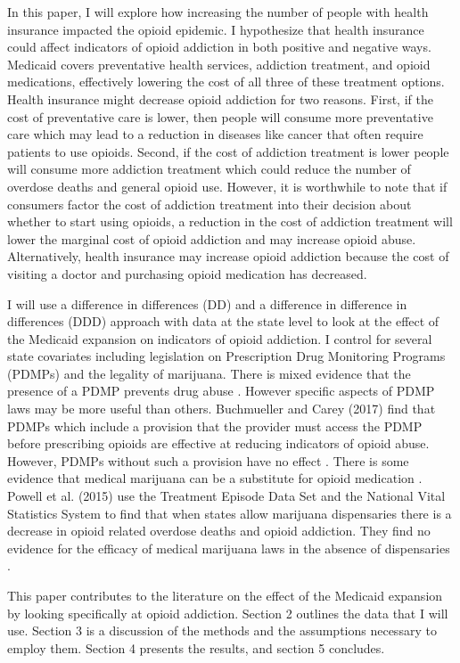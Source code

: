 \documentclass[11pt]{article}
\begin{document}
In this paper, I will explore how increasing the number of people with health insurance impacted the opioid epidemic. I hypothesize that health insurance could affect indicators of opioid addiction in both positive and negative ways.  Medicaid covers preventative health services, addiction treatment, and opioid medications, effectively lowering the cost of all three of these treatment options. Health insurance might decrease opioid addiction for two reasons.  First, if the cost of preventative care is lower, then people will consume more preventative care which may lead to a reduction in diseases like cancer that often require patients to use opioids.  Second, if the cost of addiction treatment is lower people will consume more addiction treatment which could reduce the number of overdose deaths and general opioid use.  However, it is worthwhile to note that if consumers factor the cost of addiction treatment into their decision about whether to start using opioids, a reduction in the cost of addiction treatment will lower the marginal cost of opioid addiction and may increase opioid abuse. Alternatively, health insurance may increase opioid addiction because the cost of visiting a doctor and purchasing opioid medication has decreased.  


I will use a difference in differences (DD) and a difference in difference in differences (DDD) approach with data at the state level to look at the effect of the Medicaid expansion on indicators of opioid addiction.  I control for several state covariates including legislation on Prescription Drug Monitoring Programs (PDMPs) and the legality of marijuana. There is mixed evidence that the presence of a PDMP prevents drug abuse \citep{Patrick2016, Brady2014}.  However specific aspects of PDMP laws may be more useful than others. Buchmueller and Carey (2017) find that PDMPs which include a provision that the provider must access the PDMP before prescribing opioids are effective at reducing indicators of opioid abuse.  However, PDMPs without such a provision have no effect \citep{Buchmueller2017}. There is some evidence that medical marijuana can be a substitute for opioid medication \citep{Piper2017}.  Powell et al. (2015) use the Treatment Episode Data Set and the National Vital Statistics System to find that when states allow marijuana dispensaries there is a decrease in opioid related overdose deaths and opioid addiction.  They find no evidence for the efficacy of medical marijuana laws in the absence of dispensaries \citep{Powell2015}.

This paper contributes to the literature on the effect of the Medicaid expansion by looking specifically at opioid addiction.  Section 2 outlines the data that I will use.  Section 3 is a discussion of the methods and the assumptions necessary to employ them.  Section 4 presents the results, and section 5 concludes. 
\end{document}
